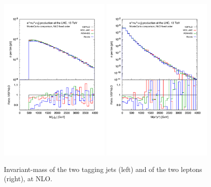 \documentclass[a4paper,10pt]{report}
\begin{document}
\begin{figure}[h!]
   \centering
   \includegraphics[width=0.49\textwidth,angle=0,clip=true,trim={0.4cm 4.cm 0.6cm 1.5cm}]{figures/mjj_NLO.pdf}
   \includegraphics[width=0.49\textwidth,angle=0,clip=true,trim={0.4cm 4.cm 0.6cm 1.5cm}]{figures/mll_NLO.pdf}
\caption{\label{fig:mjj-llNLO}Invariant-mass of the two tagging jets (left) and of the two leptons (right), at NLO.
}
\end{figure}
%
\end{document}
